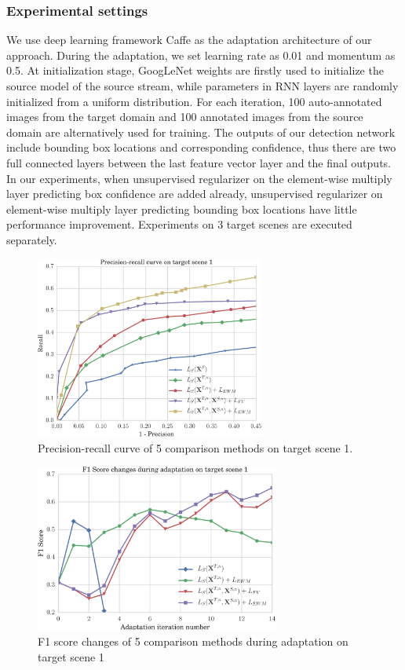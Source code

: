 \documentclass[runningheads]{llncs}
\begin{document}
\subsubsection{Experimental settings}
We use deep learning framework Caffe \cite{jia2014caffe} as the adaptation architecture of our approach. During the adaptation, we set learning rate as 0.01 and momentum as 0.5. At initialization stage, GoogLeNet weights are firstly used to initialize the source model of the source stream, while parameters in RNN layers are randomly initialized from a uniform distribution. For each iteration, 100 auto-annotated images from the target domain and 100 annotated images from the source domain are alternatively used for training. The outputs of our detection network include bounding box locations and corresponding confidence, thus there are two full connected layers between the last feature vector layer and the final outputs. In our experiments, when unsupervised regularizer on the element-wise multiply layer predicting box confidence are added already, unsupervised regularizer on element-wise multiply layer predicting bounding box locations have little performance improvement. Experiments on 3 target scenes are executed separately.

\begin{figure}
\centering
\includegraphics[height=6cm]{images/pr_curve.pdf}
\caption{Precision-recall curve of 5 comparison methods on target scene 1.}
\label{fig:pr_curve}
\end{figure}

\begin{figure}
\centering
\includegraphics[height=5.5cm]{images/f1_score.pdf}
\caption{F1 score changes of 5 comparison methods during adaptation on target scene 1}
\label{fig:f1_score}
\end{figure}
\end{document}
